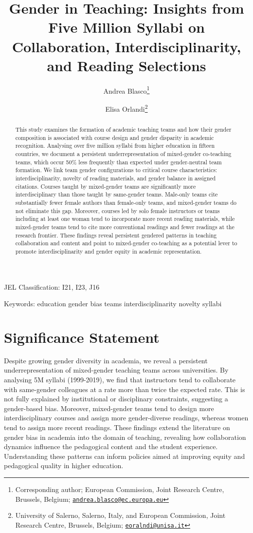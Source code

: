 \documentclass[
  british,
  11pt,
]{article}
\title{Gender in Teaching:
Insights from Five Million Syllabi on Collaboration, Interdisciplinarity, and Reading Selections}
\author{Andrea Blasco\footnote{Corresponding author; European Commission, Joint Research Centre, Brussels, Belgium; \href{mailto:andrea.blasco@ec.europa.eu}{\nolinkurl{andrea.blasco@ec.europa.eu}}} \and Elisa Orlandi\footnote{University of Salerno, Salerno, Italy, and European Commission, Joint Research Centre, Brussels, Belgium; \href{mailto:eoralndi@unisa.it}{\nolinkurl{eoralndi@unisa.it}}}}
\date{}
\begin{document}
\maketitle
\begin{abstract}
This study examines the formation of academic teaching teams and how their gender composition is associated with course design and gender disparity in academic recognition. Analysing over five million syllabi from higher education in fifteen countries, we document a persistent underrepresentation of mixed-gender co-teaching teams, which occur 50\% less frequently than expected under gender-neutral team formation. We link team gender configurations to critical course characteristics: interdisciplinarity, novelty of reading materials, and gender balance in assigned citations. Courses taught by mixed-gender teams are significantly more interdisciplinary than those taught by same-gender teams. Male-only teams cite substantially fewer female authors than female-only teams, and mixed-gender teams do not eliminate this gap. Moreover, courses led by solo female instructors or teams including at least one woman tend to incorporate more recent reading materials, while mixed-gender teams tend to cite more conventional readings and fewer readings at the research frontier. These findings reveal persistent gendered patterns in teaching collaboration and content and point to mixed-gender co-teaching as a potential lever to promote interdisciplinarity and gender equity in academic representation.
\end{abstract}

JEL Classification: I21, I23, J16

Keywords: education \textbar{} gender bias \textbar{} teams \textbar{} interdisciplinarity \textbar{} novelty \textbar{} syllabi

\newpage

\section*{Significance Statement}\label{significance-statement}

Despite growing gender diversity in academia, we reveal a persistent underrepresentation of mixed-gender teaching teams across universities. By analysing 5M syllabi (1999-2019), we find that instructors tend to collaborate with same-gender colleagues at a rate more than twice the expected rate. This is not fully explained by institutional or disciplinary constraints, suggesting a gender-based bias. Moreover, mixed-gender teams tend to design more interdisciplinary courses and assign more gender-diverse readings, whereas women tend to assign more recent readings. These findings extend the literature on gender bias in academia into the domain of teaching, revealing how collaboration dynamics influence the pedagogical content and the student experience. Understanding these patterns can inform policies aimed at improving equity and pedagogical quality in higher education.
\end{document}
